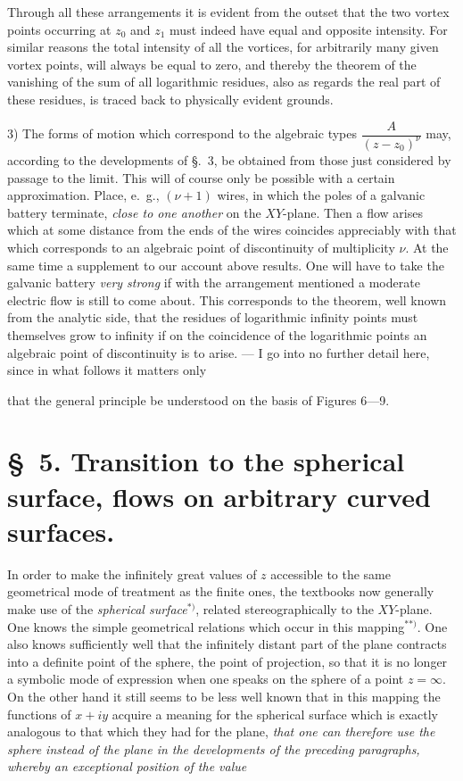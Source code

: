 \documentclass{article}
\begin{document}
Through all these arrangements it is evident from the outset that the two vortex points occurring at $z_{0}$ and $z_{1}$ must indeed have equal and opposite intensity. For similar reasons the total intensity of all the vortices, for arbitrarily many given vortex points, will always be equal to zero, and thereby the theorem of the vanishing of the sum of all logarithmic residues, also as regards the real part of these residues, is traced back to physically evident grounds.

3) The forms of motion which correspond to the algebraic types $\dfrac{A}{(z - z_{0})^{\nu}}$ may, according to the developments of §.~3, be obtained from those just considered by passage to the limit. This will of course only be possible with a certain approximation. Place, e.\ g., $(\nu + 1)$ wires, in which the poles of a galvanic battery terminate, \emph{close to one another} on the $XY$-plane. Then a flow arises which at some distance from the ends of the wires coincides appreciably with that which corresponds to an algebraic point of discontinuity of multiplicity $\nu$. At the same time a supplement to our account above results. One will have to take the galvanic battery \emph{very strong} if with the arrangement mentioned a moderate electric flow is still to come about. This corresponds to the theorem, well known from the analytic side, that the residues of logarithmic infinity points must themselves grow to infinity if on the coincidence of the logarithmic points an algebraic point of discontinuity is to arise. --- I go into no further detail here, since in what follows it matters only

that the general principle be understood on the basis of Figures 6---9.

\section*{§~5. Transition to the spherical surface, flows on arbitrary curved surfaces.}

In order to make the infinitely great values of $z$ accessible to the same geometrical mode of treatment as the finite ones, the textbooks now generally make use of the \emph{spherical surface}${}^{*)}$, related stereographically to the $XY$-plane. One knows the simple geometrical relations which occur in this mapping${}^{**)}$. One also knows sufficiently well that the infinitely distant part of the plane contracts into a definite point of the sphere, the point of projection, so that it is no longer a symbolic mode of expression when one speaks on the sphere of a point $z = \infty$. On the other hand it still seems to be less well known that in this mapping the functions of $x + iy$ acquire a meaning for the spherical surface which is exactly analogous to that which they had for the plane, \emph{that one can therefore use the sphere instead of the plane in the developments of the preceding paragraphs, whereby an exceptional position of the value}
\end{document}
